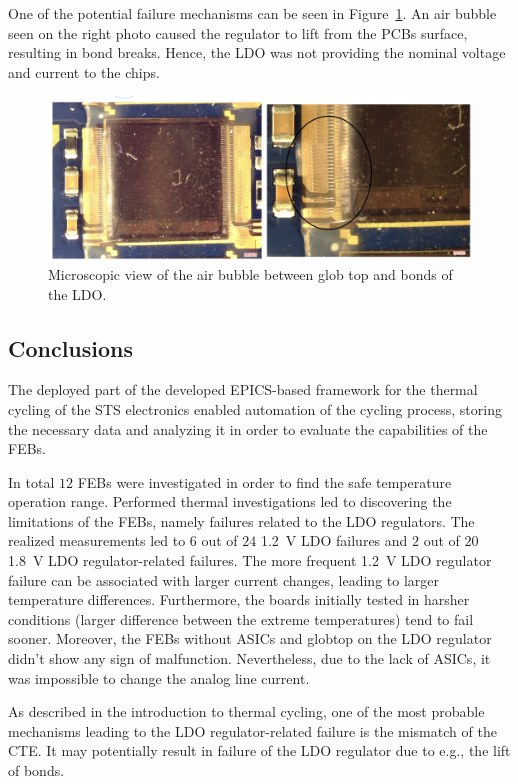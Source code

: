 One of the potential failure mechanisms can be seen in Figure~\ref{fig_ldo_lift}. An air bubble seen on the right photo caused the regulator to lift from the \glspl{PCB} surface, resulting in bond breaks. Hence, the \gls{LDO} was not providing the nominal voltage and current to the chips. 

\begin{figure}[!h]
\centering
\includegraphics[width=0.8\columnwidth]{Chapter4/images/FEB_81_LDO_lift.png}
\caption{Microscopic view of the air bubble between glob top and bonds of the \gls{LDO}.}
\label{fig_ldo_lift}
\end{figure}
\subsection{Conclusions}
The deployed part of the developed EPICS-based framework for the thermal cycling of the \gls{STS} electronics enabled automation of the cycling process, storing the necessary data and analyzing it in order to evaluate the capabilities of the \glspl{FEB}. 

In total $12$ \glspl{FEB} were investigated in order to find the safe temperature operation range. Performed thermal investigations led to discovering the limitations of the \glspl{FEB}, namely failures related to the \gls{LDO} regulators. The realized measurements led to $6$ out of $24$ \SI{1.2}{\volt} \gls{LDO} failures and $2$ out of $20$ \SI{1.8}{\volt} \gls{LDO} regulator-related failures. The more frequent \SI{1.2}{\volt} \gls{LDO} regulator failure can be associated with larger current changes, leading to larger temperature differences. Furthermore, the boards initially tested in harsher conditions (larger difference between the extreme temperatures) tend to fail sooner. Moreover, the \glspl{FEB} without \glspl{ASIC} and globtop on the LDO regulator didn’t show any sign of malfunction. Nevertheless, due to the lack of \glspl{ASIC}, it was impossible to change the analog line current.

As described in the introduction to thermal cycling, one of the most probable mechanisms leading to the \gls{LDO} regulator-related failure is the mismatch of the \gls{CTE}. It may potentially result in failure of the \gls{LDO} regulator due to e.g., the lift of bonds.

